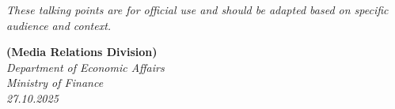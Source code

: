 \documentclass[12pt,a4paper]{article}
\begin{document}
\vspace{0.5cm}

\begin{center}
    {\small \textit{These talking points are for official use and should be adapted based on specific audience and context.}}
\end{center}

\vspace{0.3cm}

\begin{flushright}
    \textbf{(Media Relations Division)}\\
    \textit{Department of Economic Affairs}\\
    \textit{Ministry of Finance}\\
    \textit{27.10.2025}
\end{flushright}
\end{document}
